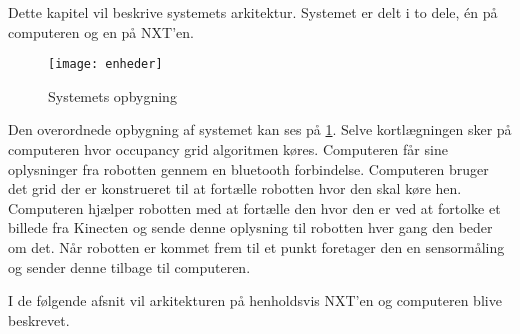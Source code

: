 Dette kapitel vil beskrive systemets arkitektur.
Systemet er delt i to dele, én på computeren og en på NXT'en.


\begin{figure}[H]
\centering
\texttt{[image: enheder]}
\caption{Systemets opbygning}
\label{arkitektur:opbygning}
\end{figure}

Den overordnede opbygning af systemet kan ses på \cref{arkitektur:opbygning}.
Selve kortlægningen sker på computeren hvor occupancy grid algoritmen køres.
Computeren får sine oplysninger fra robotten gennem en bluetooth forbindelse.
Computeren bruger det grid der er konstrueret til at fortælle robotten hvor den skal køre hen.
Computeren hjælper robotten med at fortælle den hvor den er ved at fortolke et billede fra Kinecten og sende denne oplysning til robotten hver gang den beder om det.
Når robotten er kommet frem til et punkt foretager den en sensormåling og sender denne tilbage til computeren.

I de følgende afsnit vil arkitekturen på henholdsvis NXT'en og computeren blive beskrevet.

